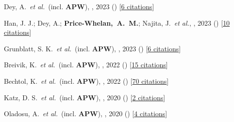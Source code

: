 \item[{\color{deemph}\scriptsize14}]Dey, A.~\textit{et al.}~(incl. \textbf{APW}), , 2023 () [\href{http://adsabs.harvard.edu/abs/2023arXiv230612302D}{6 citations}]

\item[{\color{deemph}\scriptsize13}]Han, J. J.; Dey, A.; \textbf{Price-Whelan,~A.~M.}; Najita, J.~\textit{et al.}, , 2023 () [\href{http://adsabs.harvard.edu/abs/2023arXiv230611784H}{10 citations}]

\item[{\color{deemph}\scriptsize12}]Grunblatt, S. K.~\textit{et al.}~(incl. \textbf{APW}), , 2023 () [\href{http://adsabs.harvard.edu/abs/2023arXiv230610647G}{6 citations}]

\item[{\color{deemph}\scriptsize11}]Breivik, K.~\textit{et al.}~(incl. \textbf{APW}), , 2022 () [\href{http://adsabs.harvard.edu/abs/2022arXiv220802781B}{15 citations}]

\item[{\color{deemph}\scriptsize10}]Bechtol, K.~\textit{et al.}~(incl. \textbf{APW}), , 2022 () [\href{http://adsabs.harvard.edu/abs/2022arXiv220307354B}{70 citations}]

\item[{\color{deemph}\scriptsize9}]Katz, D. S.~\textit{et al.}~(incl. \textbf{APW}), , 2020 () [\href{http://adsabs.harvard.edu/abs/2020arXiv201005102K}{2 citations}]

\item[{\color{deemph}\scriptsize8}]Oladosu, A.~\textit{et al.}~(incl. \textbf{APW}), , 2020 () [\href{http://adsabs.harvard.edu/abs/2020arXiv200704459O}{4 citations}]

